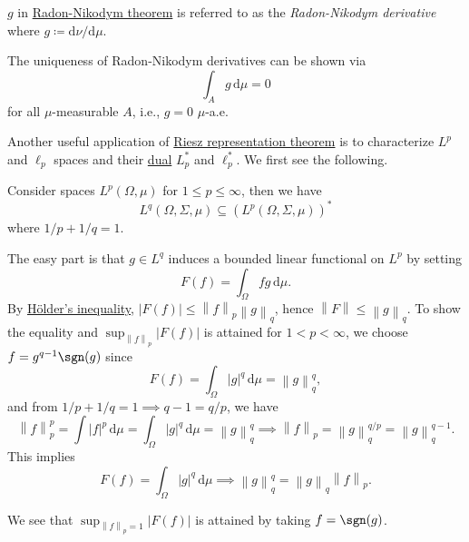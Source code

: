 \begin{notation}
	\(g\) in \hyperref[thm:Radon-Nikodym]{Radon-Nikodym theorem} is referred to as the \emph{Radon-Nikodym derivative} where \(g \coloneqq \mathrm{d}\nu /\mathrm{d}\mu \).
\end{notation}

\begin{note}[Uniqueness]
	The uniqueness of Radon-Nikodym derivatives can be shown via
	\[
		\int _A g\,\mathrm{d} \mu = 0
	\]
	for all \(\mu \)-measurable \(A\), i.e., \(g=0\) \(\mu\)-a.e.
\end{note}

Another useful application of \hyperref[thm:Riesz-representation]{Riesz representation theorem} is to characterize \(L^p\) and \(\ell _p\) spaces and their \hyperref[def:dual-space]{dual} \(L^{\ast} _p\) and \(\ell ^{\ast} _p\). We first see the following.
\begin{remark}
	Consider spaces \(L^p(\Omega , \mu )\) for \(1 \leq p \leq \infty \), then we have
	\[
		L^{q}(\Omega , \Sigma , \mu )\subseteq (L^p(\Omega , \Sigma , \mu ))^{\ast}
	\]
	where \(1 / p + 1 / q = 1\).
\end{remark}
\begin{explanation}
	The easy part is that \(g\in L^q\) induces a bounded linear functional on \(L^p\) by setting
	\[
		F(f) = \int _\Omega fg\,\mathrm{d} \mu.
	\]
	By \hyperref[lma:Holder-ineq]{Hölder's inequality}, \(\left\vert F(f) \right\vert \leq \left\lVert f\right\rVert _p \left\lVert g\right\rVert _q\), hence \(\left\lVert F\right\rVert \leq \left\lVert g\right\rVert _q\). To show the equality and \(\sup _{\left\lVert f\right\rVert _p}\left\vert F(f) \right\vert \) is attained for \(1 < p < \infty \), we choose \(f = g^{q - 1}\sgn(g)\) since
	\[
		F(f) = \int _\Omega \left\vert g \right\vert ^q\,\mathrm{d} \mu = \left\lVert g\right\rVert ^q_q,
	\]
	and from \(1 / p + 1 / q = 1 \implies q-1 = q / p\), we have
	\[
		\left\lVert f\right\rVert ^p_p = \int \left\vert f \right\vert ^p \,\mathrm{d} \mu= \int _\Omega \left\vert g \right\vert ^q\,\mathrm{d} \mu = \left\lVert g\right\rVert _q^q \implies \left\lVert f\right\rVert _p = \left\lVert g\right\rVert _q^{q / p} = \left\lVert g\right\rVert _q^{q - 1}.
	\]
	This implies
	\[
		F(f) = \int _\Omega \left\vert g \right\vert ^q\,\mathrm{d} \mu \implies \left\lVert g\right\rVert ^q_q = \left\lVert g\right\rVert _q \left\lVert f\right\rVert _p.
	\]
	\begin{note}
		We see that \(\sup _{\left\lVert f\right\rVert _p = 1} \left\vert F(f) \right\vert \) is attained by taking \(f = \sgn(g)\).
	\end{note}
\end{explanation}

